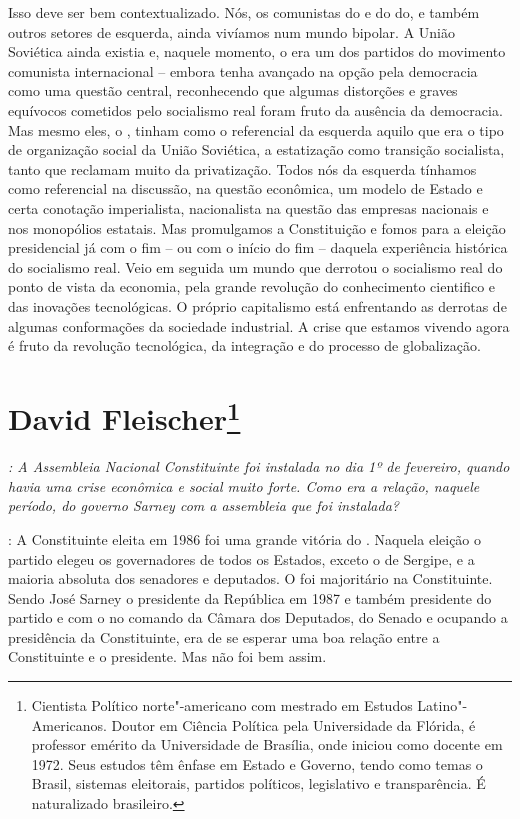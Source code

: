 Isso deve ser bem contextualizado. Nós, os comunistas
do  e do do, e também outros setores de esquerda, ainda vivíamos
num mundo bipolar. A União Soviética ainda existia e, naquele momento, o
 era um dos partidos do movimento comunista internacional -- embora
tenha avançado na opção pela democracia como uma questão central,
reconhecendo que algumas distorções e graves equívocos cometidos pelo
socialismo real foram fruto da ausência da democracia. Mas mesmo eles, o
, tinham como o referencial da esquerda aquilo que era o tipo de
organização social da União Soviética, a estatização como transição
socialista, tanto que reclamam muito da privatização. Todos nós da
esquerda tínhamos como referencial na discussão, na questão econômica,
um modelo de Estado e certa conotação imperialista, nacionalista na
questão das empresas nacionais e nos monopólios estatais. Mas
promulgamos a Constituição e fomos para a eleição presidencial já com o
fim -- ou com o início do fim -- daquela experiência histórica do
socialismo real. Veio em seguida um mundo que derrotou o socialismo real
do ponto de vista da economia, pela grande revolução do conhecimento
cientifico e das inovações tecnológicas. O próprio capitalismo está
enfrentando as derrotas de algumas conformações da sociedade industrial.
A crise que estamos vivendo agora é fruto da revolução tecnológica, da
integração e do processo de globalização.

\chapter{David Fleischer\footnote{Cientista Político norte"-americano com mestrado em Estudos
Latino"-Americanos. Doutor em Ciência Política pela Universidade da
Flórida, é professor emérito da Universidade de Brasília, onde iniciou
como docente em 1972. Seus estudos têm ênfase em Estado e Governo, tendo
como temas o Brasil, sistemas eleitorais, partidos políticos,
legislativo e transparência. É naturalizado brasileiro.}}

\emph{: A Assembleia Nacional Constituinte foi instalada no dia 1º de
fevereiro, quando havia uma crise econômica e social muito forte. Como
era a relação, naquele período, do governo Sarney com a assembleia que
foi instalada?}

: A Constituinte eleita em 1986 foi uma grande vitória
do . Naquela eleição o partido elegeu os governadores de todos os
Estados, exceto o de Sergipe, e a maioria absoluta dos senadores e
deputados. O  foi majoritário na Constituinte. Sendo José Sarney o
presidente da República em 1987 e também presidente do partido e com o
 no comando da Câmara dos Deputados, do Senado e ocupando a
presidência da Constituinte, era de se esperar uma boa relação entre a
Constituinte e o presidente. Mas não foi bem assim.

